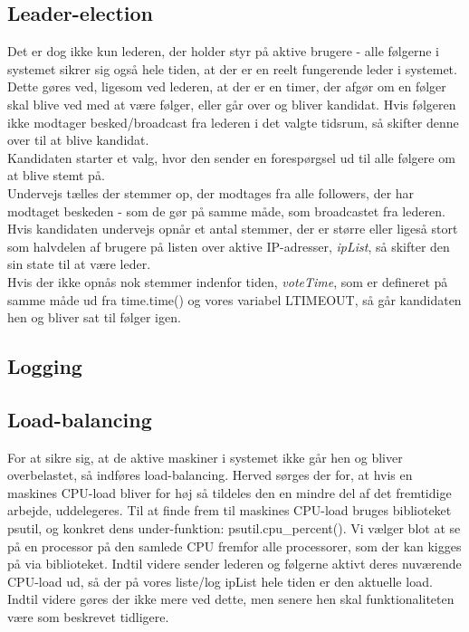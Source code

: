 \documentclass[a4paper,12pt]{article}
\begin{document}
\subsection*{Leader-election}
Det er dog ikke kun lederen, der holder styr på aktive brugere - alle følgerne i systemet sikrer sig også hele tiden, at der er en reelt fungerende leder i systemet.
\\
Dette gøres ved, ligesom ved lederen, at der er en timer, der afgør om en følger skal blive ved med at være følger, eller går over og bliver kandidat. Hvis følgeren ikke modtager besked/broadcast fra lederen i det valgte tidsrum, så skifter denne over til at blive kandidat.
\\[5px]
Kandidaten starter et valg, hvor den sender en forespørgsel ud til alle følgere om at blive stemt på.
\\
Undervejs tælles der stemmer op, der modtages fra alle followers, der har modtaget beskeden - som de gør på samme måde, som broadcastet fra lederen. Hvis kandidaten undervejs opnår et antal stemmer, der er større eller ligeså stort som halvdelen af brugere på listen over aktive IP-adresser, \textit{ipList}, så skifter den sin state til at være leder.
\\
Hvis der ikke opnås nok stemmer indenfor tiden, \textit{voteTime}, som er defineret på samme måde ud fra time.time() og vores variabel LTIMEOUT, så går kandidaten hen og bliver sat til følger igen.


\subsection*{Logging}


\subsection*{Load-balancing}
For at sikre sig, at de aktive maskiner i systemet ikke går hen
 og bliver overbelastet, så indføres load-balancing. Herved
  sørges der for, at hvis en maskines CPU-load bliver for høj
   så tildeles den en mindre del af det fremtidige arbejde, 
    uddelegeres. Til at finde frem til maskines CPU-load bruges
    biblioteket psutil, og konkret dens under-funktion:
     psutil.cpu\_percent().
Vi vælger blot at se på en processor på den samlede CPU fremfor alle processorer, som der kan kigges på via biblioteket.
Indtil videre sender lederen og følgerne aktivt deres nuværende CPU-load ud, så der på vores liste/log ipList hele tiden er den aktuelle load. Indtil videre gøres der ikke mere ved dette, men senere hen skal funktionaliteten være som beskrevet tidligere.
\end{document}
